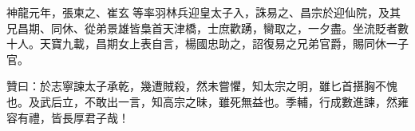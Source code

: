 \begin{pinyinscope}
 神龍元年，張柬之、崔玄等率羽林兵迎皇太子入，誅易之、昌宗於迎仙院，及其兄昌期、同休、從弟景雄皆梟首天津橋，士庶歡踴，臠取之，一夕盡。坐流貶者數十人。天寶九載，昌期女上表自言，楊國忠助之，詔復易之兄弟官爵，賜同休一子官。



 贊曰：於志寧諫太子承乾，幾遭賊殺，然未嘗懼，知太宗之明，雖匕首揕胸不愧也。及武后立，不敢出一言，知高宗之昧，雖死無益也。季輔，行成數進諫，然雍容有禮，皆長厚君子哉！



\end{pinyinscope}